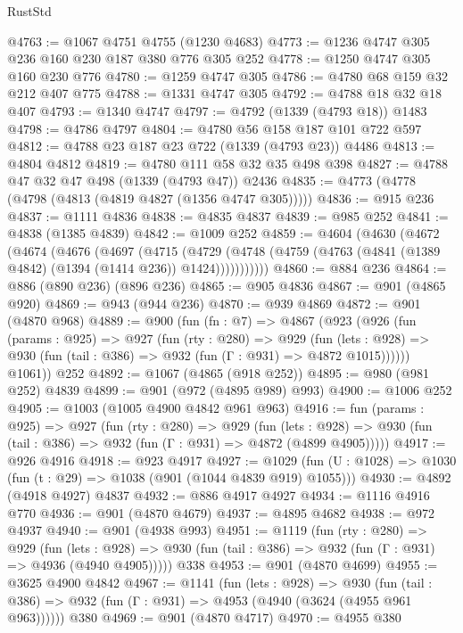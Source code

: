 \begin{lexlean}{RustStd}
\begin{coremodule}
@4763 := @1067 @4751 @4755 (@1230 @4683)
@4773 := @1236 @4747 @305 @236 @160 @230 @187 @380 @776 @305 @252
@4778 := @1250 @4747 @305 @160 @230 @776
@4780 := @1259 @4747 @305
@4786 := @4780 @68 @159 @32 @212 @407 @775
@4788 := @1331 @4747 @305
@4792 := @4788 @18 @32 @18 @407
@4793 := @1340 @4747
@4797 := @4792 (@1339 (@4793 @18)) @1483
@4798 := @4786 @4797
@4804 := @4780 @56 @158 @187 @101 @722 @597
@4812 := @4788 @23 @187 @23 @722 (@1339 (@4793 @23)) @4486
@4813 := @4804 @4812
@4819 := @4780 @111 @58 @32 @35 @498 @398
@4827 := @4788 @47 @32 @47 @498 (@1339 (@4793 @47)) @2436
@4835 := @4773 (@4778 (@4798 (@4813 (@4819 @4827 (@1356 @4747 @305)))))
@4836 := @915 @236
@4837 := @1111 @4836
@4838 := @4835 @4837
@4839 := @985 @252
@4841 := @4838 (@1385 @4839)
@4842 := @1009 @252
@4859 := @4604
    (@4630
      (@4672
        (@4674
          (@4676
            (@4697
              (@4715
                (@4729
                  (@4748 (@4759 (@4763 (@4841 (@1389 @4842) (@1394 (@1414 @236)) @1424)))))))))))
@4860 := @884 @236
@4864 := @886 (@890 @236) (@896 @236)
@4865 := @905 @4836
@4867 := @901 (@4865 @920)
@4869 := @943 (@944 @236)
@4870 := @939 @4869
@4872 := @901 (@4870 @968)
@4889 := @900
    (fun (fn : @7) =>
    @4867
      (@923
        (@926
          (fun (params : @925) =>
          @927
            (fun (rty : @280) =>
            @929
              (fun (lets : @928) =>
              @930 (fun (tail : @386) => @932 (fun (Γ : @931) => @4872 @1015))))))
        @1061))
    @252
@4892 := @1067 (@4865 (@918 @252))
@4895 := @980 (@981 @252) @4839
@4899 := @901 (@972 (@4895 @989) @993)
@4900 := @1006 @252
@4905 := @1003 (@1005 @4900 @4842 @961 @963)
@4916 := fun (params : @925) =>
  @927
    (fun (rty : @280) =>
    @929
      (fun (lets : @928) =>
      @930 (fun (tail : @386) => @932 (fun (Γ : @931) => @4872 (@4899 @4905)))))
@4917 := @926 @4916
@4918 := @923 @4917
@4927 := @1029 (fun (U : @1028) => @1030 (fun (t : @29) => @1038 (@901 (@1044 @4839 @919) @1055)))
@4930 := @4892 (@4918 @4927) @4837
@4932 := @886 @4917 @4927
@4934 := @1116 @4916 @770
@4936 := @901 (@4870 @4679)
@4937 := @4895 @4682
@4938 := @972 @4937
@4940 := @901 (@4938 @993)
@4951 := @1119
    (fun (rty : @280) =>
    @929
      (fun (lets : @928) =>
      @930 (fun (tail : @386) => @932 (fun (Γ : @931) => @4936 (@4940 @4905)))))
    @338
@4953 := @901 (@4870 @4699)
@4955 := @3625 @4900 @4842
@4967 := @1141
    (fun (lets : @928) =>
    @930 (fun (tail : @386) => @932 (fun (Γ : @931) => @4953 (@4940 (@3624 (@4955 @961 @963))))))
    @380
@4969 := @901 (@4870 @4717)
@4970 := @4955 @380

\end{coremodule}
\end{lexlean}
